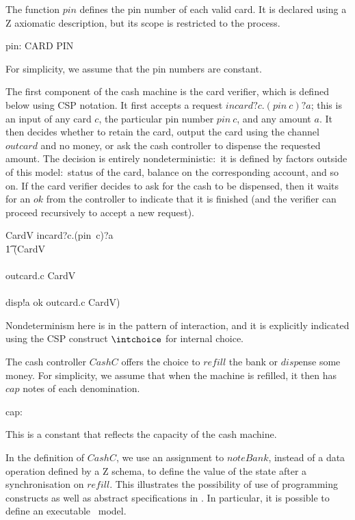 \documentclass{article}
\begin{document}
The function $pin$ defines the pin number of each valid card.  It is
declared using a Z axiomatic description, but its scope is restricted
to the process.
\begin{axdef}
  pin: CARD \fun PIN
\end{axdef}
For simplicity, we assume that the pin numbers are constant.

The first component of the cash machine is the card verifier, which
is defined below using CSP notation.  It first accepts a request
$incard?c.(pin~c)?a$; this is an input of any card $c$, the
particular pin number $pin~c$, and any amount $a$. It then decides
whether to retain the card, output the card using the channel
$outcard$ and no money, or ask the cash controller to dispense the
requested amount. The decision is entirely nondeterministic:~it is
defined by factors outside of this model:~status of the card, balance
on the corresponding account, and so on.  If the card verifier
decides to ask for the cash to be dispensed, then it waits for an
$ok$ from the controller to indicate that it is finished (and the
verifier can proceed recursively to accept a new request).
\begin{circusaction}
  CardV \circdef
  \circblockbegin
  incard?c.(pin~c)?a \then
            \\ %
      \t1 \circblockbegin
          (CardV
          \\
          \intchoice
          \\ %
          outcard.c \then CardV
          \\ %
          \intchoice
          \\ %
          disp!a \then ok \then outcard.c \then CardV)
      \circblockend
  \circblockend
\end{circusaction}
Nondeterminism here is in the pattern of interaction, and it is
explicitly indicated using the CSP construct $\intchoice$ for
internal choice.

The cash controller $CashC$ offers the choice to $refill$ the bank or
$disp$ense some money.  For simplicity, we assume that when the
machine is refilled, it then has $cap$ notes of each denomination.
\begin{axdef}
  cap: \nat
\end{axdef}
This is a constant that reflects the capacity of the cash machine.

In the definition of $CashC$, we use an assignment to $noteBank$,
instead of a data operation defined by a Z schema, to define the
value of the state after a synchronisation on $refill$.  This
illustrates the possibility of use of programming constructs as well
as abstract specifications in \Circus.  In particular, it is possible
to define an executable \Circus\ model.
\end{document}
